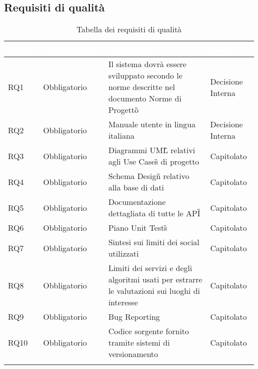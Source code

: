 \subsection{Requisiti di qualità}
{
      \setlength{\freewidth}{\dimexpr\textwidth-10\tabcolsep}
      \renewcommand{\arraystretch}{1.5}
      \centering
      \setlength{\aboverulesep}{0pt}
      \setlength{\belowrulesep}{0pt}
      \begin{longtable}{C{.15\freewidth} C{.2\freewidth} C{.528\freewidth} C{.15\freewidth}}
         \toprule
      \textcolor{white}{\textbf{Codice}}&
      \textcolor{white}{\textbf{Classificazione}}&
      \textcolor{white}{\textbf{Descrizione}}&
      \textcolor{white}{\textbf{Fonti}}\\	
      \toprule
      \endhead
      
      RQ1 & Obbligatorio & Il sistema dovrà essere sviluppato secondo le norme descritte nel documento Norme di Progetto\G{} & Decisione Interna \\
      RQ2 & Obbligatorio & Manuale utente in lingua italiana & Decisione Interna \\
      RQ3 & Obbligatorio & Diagrammi UML\G{} relativi agli Use Cases\G{} di progetto & Capitolato \\
      RQ4 & Obbligatorio & Schema Design\G{} relativo alla base di dati & Capitolato \\
      RQ5 & Obbligatorio & Documentazione dettagliata di tutte le API\G{} & Capitolato \\
      RQ6 & Obbligatorio & Piano Unit Tests\G{} & Capitolato \\
      RQ7 & Obbligatorio & Sintesi sui limiti dei social utilizzati & Capitolato \\
      RQ8 & Obbligatorio & Limiti dei servizi e degli algoritmi usati per estrarre le valutazioni sui luoghi di interesse & Capitolato \\	   
      RQ9 & Obbligatorio & Bug Reporting & Capitolato \\
      RQ10 & Obbligatorio & Codice sorgente fornito tramite sistemi di versionamento & Capitolato \\
      \bottomrule
      \caption{Tabella dei requisiti di qualità}
      \end{longtable}
}

\newpage
